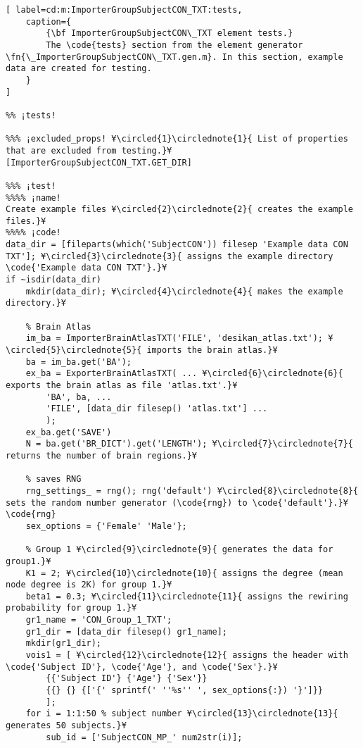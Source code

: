 \documentclass{tufte-handout}
\begin{document}
\begin{lstlisting}[	label=cd:m:ImporterGroupSubjectCON_TXT:tests,
	caption={
		{\bf ImporterGroupSubjectCON\_TXT element tests.}
		The \code{tests} section from the element generator \fn{\_ImporterGroupSubjectCON\_TXT.gen.m}. In this section, example data are created for testing.
	}
]

%% ¡tests!

%%% ¡excluded_props! ¥\circled{1}\circlednote{1}{ List of properties that are excluded from testing.}¥
[ImporterGroupSubjectCON_TXT.GET_DIR]

%%% ¡test!
%%%% ¡name!
Create example files ¥\circled{2}\circlednote{2}{ creates the example files.}¥
%%%% ¡code!
data_dir = [fileparts(which('SubjectCON')) filesep 'Example data CON TXT']; ¥\circled{3}\circlednote{3}{ assigns the example directory \code{'Example data CON TXT'}.}¥
if ~isdir(data_dir)
    mkdir(data_dir); ¥\circled{4}\circlednote{4}{ makes the example directory.}¥

    % Brain Atlas
    im_ba = ImporterBrainAtlasTXT('FILE', 'desikan_atlas.txt'); ¥\circled{5}\circlednote{5}{ imports the brain atlas.}¥
    ba = im_ba.get('BA');
    ex_ba = ExporterBrainAtlasTXT( ... ¥\circled{6}\circlednote{6}{ exports the brain atlas as file 'atlas.txt'.}¥
        'BA', ba, ...
        'FILE', [data_dir filesep() 'atlas.txt'] ...
        );
    ex_ba.get('SAVE')
    N = ba.get('BR_DICT').get('LENGTH'); ¥\circled{7}\circlednote{7}{ returns the number of brain regions.}¥

    % saves RNG
    rng_settings_ = rng(); rng('default') ¥\circled{8}\circlednote{8}{ sets the random number generator (\code{rng}) to \code{'default'}.}¥
\code{rng}
    sex_options = {'Female' 'Male'};

    % Group 1 ¥\circled{9}\circlednote{9}{ generates the data for group1.}¥
    K1 = 2; ¥\circled{10}\circlednote{10}{ assigns the degree (mean node degree is 2K) for group 1.}¥
    beta1 = 0.3; ¥\circled{11}\circlednote{11}{ assigns the rewiring probability for group 1.}¥
    gr1_name = 'CON_Group_1_TXT';
    gr1_dir = [data_dir filesep() gr1_name];
    mkdir(gr1_dir);
    vois1 = [ ¥\circled{12}\circlednote{12}{ assigns the header with \code{'Subject ID'}, \code{'Age'}, and \code{'Sex'}.}¥
        {{'Subject ID'} {'Age'} {'Sex'}}
        {{} {} {['{' sprintf(' ''%s'' ', sex_options{:}) '}']}}
        ];
    for i = 1:1:50 % subject number ¥\circled{13}\circlednote{13}{ generates 50 subjects.}¥
        sub_id = ['SubjectCON_MP_' num2str(i)];


\end{lstlisting}
\end{document}
